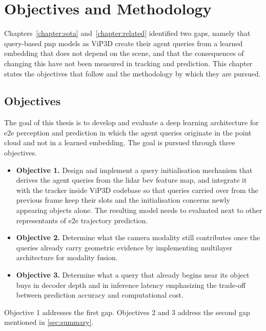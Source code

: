 \chapter{Objectives and Methodology}
\label{chapter:objectives-and-methodology}

Chapters~\ref{chapter:sota} and~\ref{chapter:related} identified two gaps, namely that query-based
\ac{pnp} models as ViP3D \cite{Gu2023ViP3D} create their agent queries from a learned embedding that does not depend on the
scene, and that the consequences of changing this have not been measured in tracking and prediction.
This chapter states the objectives that follow and the methodology by which they are pursued.

\section{Objectives}
\label{sec:objectives}

The goal of this thesis is to develop and evaluate a deep learning architecture for \ac{e2e} perception and
prediction in which the agent queries originate in the point cloud and not in a learned embedding. The
goal is pursued through three objectives.

\begin{itemize}
    \item \textbf{Objective 1.} Design and implement a query initialisation mechanism that derives the 
    agent queries from the \ac{lidar} \ac{bev} feature map, and
    integrate it with the tracker inside ViP3D \cite{Gu2023ViP3D} codebase so that queries carried over from the previous frame keep their slots and
    the initialisation concerns newly appearing objects alone. The resulting model needs to evaluated next to other 
    representants of \ac{e2e} trajectory prediction.

    \item \textbf{Objective 2.} Determine what the camera modality still contributes once the queries already carry
    geometric evidence by implementing multilayer architecture for modality fusion. 

    \item \textbf{Objective 3.} Determine what a query that already begins near its object buys in decoder
    depth and in inference latency emphasizing the trade-off between prediction accuracy and computational cost. 
\end{itemize}

Objective 1 addresses the first gap. Objectives 2 and 3 address the second gap mentioned in \ref{sec:summary}.

